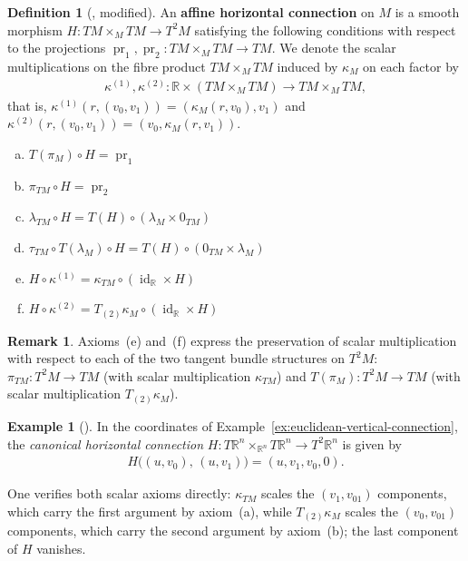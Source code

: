 \documentclass{amsart}
\newcommand{\R}{\mathbb{R}}
\DeclareMathOperator{\pr}{pr}
\DeclareMathOperator{\id}{id}
\theoremstyle{definition}
\newtheorem{defn}[thm]{Definition}
\newtheorem{rem}[thm]{Remark}
\newtheorem{ex}[thm]{Example}
\begin{document}
\begin{defn}[{\cite[Definitions~4.5, 4.6]{CC17}, modified}]\label{def:horizontal-connection}
An \textbf{affine horizontal connection} on $M$ is a
smooth morphism $H \colon TM \times_M TM \to T^2M$ satisfying the following conditions
with respect to the projections $\pr_1, \pr_2 \colon TM \times_M TM \to TM$.
We denote the scalar multiplications on the fibre product $TM \times_M TM$
induced by $\kappa_M$ on each factor by
\begin{align*}
  \kappa^{(1)}, \kappa^{(2)} \colon \R \times (TM \times_M TM) \to TM \times_M TM,
\end{align*}
that is, $\kappa^{(1)}(r, (v_0, v_1)) = (\kappa_M(r, v_0), v_1)$ and
$\kappa^{(2)}(r, (v_0, v_1)) = (v_0, \kappa_M(r, v_1))$.
\begin{enumerate}[(a)]
    \item $T(\pi_M) \circ H = \pr_1$
    \item $\pi_{TM} \circ H = \pr_2$
    \item $\lambda_{TM} \circ H = T(H) \circ (\lambda_M \times 0_{TM})$
    \item $\tau_{TM} \circ T(\lambda_M) \circ H = T(H) \circ (0_{TM} \times \lambda_M)$
    \item $H \circ \kappa^{(1)} = \kappa_{TM} \circ (\id_{\R} \times H)$
    \item $H \circ \kappa^{(2)} = T_{(2)}\kappa_M \circ (\id_{\R} \times H)$
\end{enumerate}
\end{defn}

\begin{rem}\label{rem:horizontal-scalar-axiom}
  Axioms~(e) and~(f) express the preservation of scalar multiplication with respect
  to each of the two tangent bundle structures on $T^2M$:
  $\pi_{TM} \colon T^2M \to TM$ (with scalar multiplication $\kappa_{TM}$) and
  $T(\pi_M) \colon T^2M \to TM$ (with scalar multiplication $T_{(2)}\kappa_M$).
\end{rem}

\begin{ex}[{\cite[Example~3.6]{LW}}]%
\label{ex:euclidean-horizontal-connection}
In the coordinates of Example~\ref{ex:euclidean-vertical-connection}, the
\emph{canonical horizontal connection}
$H \colon T\R^n \times_{\R^n} T\R^n \to T^2\R^n$ is given by
\begin{align*}
    H\bigl((u, v_0),\, (u, v_1)\bigr) = (u, v_1, v_0, 0).
\end{align*}

One verifies both scalar axioms directly: $\kappa_{TM}$ scales the $(v_1, v_{01})$ components, which carry the first argument by axiom~(a), while $T_{(2)}\kappa_M$ scales the $(v_0, v_{01})$ components, which carry the second argument by axiom~(b); the last component of $H$ vanishes.
\end{ex}
\end{document}
